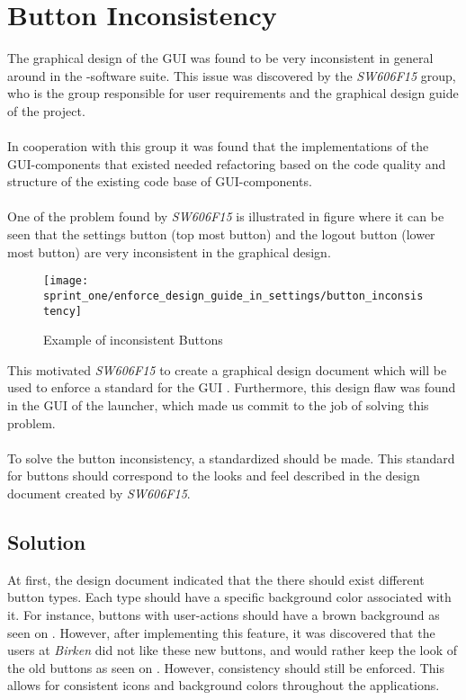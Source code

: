 \section{Button Inconsistency}
\label{sub:button_inconsistency}

The graphical design of the GUI was found to be very inconsistent in general around in the \giraf-software suite. This issue was discovered by the \emph{SW606F15} group, who is the group responsible for user requirements and the graphical design guide of the project.
\\\\
In cooperation with this group it was found that the implementations of the GUI-components that existed needed refactoring based on the code quality and structure of the existing code base of GUI-components.
\\\\
One of the problem found by \emph{SW606F15} is illustrated in figure  where it can be seen that the settings button (top most button) and the logout button (lower most button) are very inconsistent in the graphical design. 

\begin{figure}[!htbp]
    \centering
    \texttt{[image: sprint\_one/enforce\_design\_guide\_in\_settings/button\_inconsistency]}
    \caption{Example of inconsistent Buttons}
    \label{fig:button_inconsistency}
\end{figure}

This motivated \emph{SW606F15} to create a graphical design document which will be used to enforce a standard for the GUI . Furthermore, this design flaw was found in the GUI of the launcher, which made us commit to the job of solving this problem. 
\\\\
To solve the button inconsistency, a standardized should be made. This standard for buttons should correspond to the looks and feel described in the design document created by \emph{SW606F15}. 

\subsection{Solution}
\label{sub:solution}

At first, the design document indicated that the there should exist different button types. Each type should have a specific background color associated with it. For instance, buttons with user-actions should have a brown background as seen on . However, after implementing this feature, it was discovered that the users at \emph{Birken} did not like these new buttons, and would rather keep the look of the old buttons as seen on . However, consistency should still be enforced. This allows for consistent icons and background colors throughout the applications.\\


